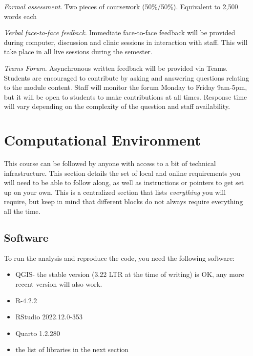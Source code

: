 \documentclass[
  letterpaper,
  DIV=11,
  numbers=noendperiod]{scrreprt}
\providecommand{\tightlist}{%
  \setlength{\itemsep}{0pt}\setlength{\parskip}{0pt}}\usepackage{longtable,booktabs,array}
\begin{document}
\href{https://gdsl-ul.github.io/wma/assess.html}{\emph{Formal
assessment}}. Two pieces of coursework (50\%/50\%). Equivalent to 2,500
words each

\emph{Verbal face-to-face feedback}. Immediate face-to-face feedback
will be provided during computer, discussion and clinic sessions in
interaction with staff. This will take place in all live sessions during
the semester.

\emph{Teams Forum}. Asynchronous written feedback will be provided via
Teams. Students are encouraged to contribute by asking and answering
questions relating to the module content. Staff will monitor the forum
Monday to Friday 9am-5pm, but it will be open to students to make
contributions at all times. Response time will vary depending on the
complexity of the question and staff availability.

\hypertarget{computational-environment}{%
\section*{Computational Environment}\label{computational-environment}}


This course can be followed by anyone with access to a bit of technical
infrastructure. This section details the set of local and online
requirements you will need to be able to follow along, as well as
instructions or pointers to get set up on your own. This is a
centralized section that lists \emph{everything} you will require, but
keep in mind that different blocks do not always require everything all
the time.

\hypertarget{software}{%
\subsection*{Software}\label{software}}

To run the analysis and reproduce the code, you need the following
software:

\begin{itemize}
\tightlist
\item
  QGIS- the stable version (3.22 LTR at the time of writing) is OK, any
  more recent version will also work.
\item
  R-4.2.2
\item
  RStudio 2022.12.0-353
\item
  Quarto 1.2.280
\item
  the list of libraries in the next section
\end{itemize}
\end{document}
